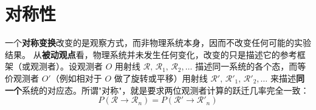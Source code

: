 \newpage\section{对称性}
一个\textbf{对称变换}改变的是观察方式，而非物理系统本身，因而不改变任何可能的实验结果。
从\textbf{被动观点}看，物理系统并未发生任何变化，改变的只是描述它的参考框架（或观测者）。设观测者 $O$ 用射线 $\mathscr{R},\,\mathscr{R}_1,\,\mathscr{R}_2,\dots$ 描述同一系统的各个态，而等价观测者 $O'$（例如相对于 $O$ 做了旋转或平移）用射线 $\mathscr{R}',\,\mathscr{R}'_1,\,\mathscr{R}'_2,\dots$ 来描述\textbf{同一个}系统的对应态。所谓"对称"，就是要求两位观测者计算的跃迁几率完全一致：
\begin{equation}
    P(\mathscr{R} \to \mathscr{R}_n) = P(\mathscr{R}' \to \mathscr{R}'_n)
\end{equation}

